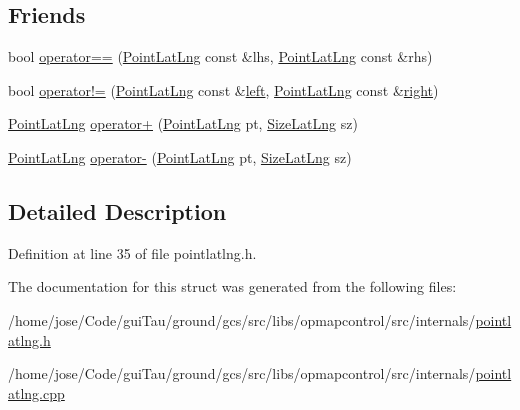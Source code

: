 \subsection*{Friends}
\begin{DoxyCompactItemize}
\item 
bool \hyperlink{group___o_p_map_widget_ga9265718a15e315e6d89a008c945393b3}{operator==} (\hyperlink{structinternals_1_1_point_lat_lng}{Point\-Lat\-Lng} const \&lhs, \hyperlink{structinternals_1_1_point_lat_lng}{Point\-Lat\-Lng} const \&rhs)
\item 
bool \hyperlink{group___o_p_map_widget_gab7da08dc85e294bae6bc1e2aed690d7f}{operator!=} (\hyperlink{structinternals_1_1_point_lat_lng}{Point\-Lat\-Lng} const \&\hyperlink{glext_8h_a85b8f6c07fbc1fb5d77c2ae090f21995}{left}, \hyperlink{structinternals_1_1_point_lat_lng}{Point\-Lat\-Lng} const \&\hyperlink{glext_8h_a5ffadbbacc6b89cf6218bc43b384d3fe}{right})
\item 
\hyperlink{structinternals_1_1_point_lat_lng}{Point\-Lat\-Lng} \hyperlink{group___o_p_map_widget_ga488020cfd021f98e4856f128d9448367}{operator+} (\hyperlink{structinternals_1_1_point_lat_lng}{Point\-Lat\-Lng} pt, \hyperlink{structinternals_1_1_size_lat_lng}{Size\-Lat\-Lng} sz)
\item 
\hyperlink{structinternals_1_1_point_lat_lng}{Point\-Lat\-Lng} \hyperlink{group___o_p_map_widget_ga7af0e8545fa560e7264f0c7cedae458b}{operator-\/} (\hyperlink{structinternals_1_1_point_lat_lng}{Point\-Lat\-Lng} pt, \hyperlink{structinternals_1_1_size_lat_lng}{Size\-Lat\-Lng} sz)
\end{DoxyCompactItemize}


\subsection{Detailed Description}


Definition at line 35 of file pointlatlng.\-h.



The documentation for this struct was generated from the following files\-:\begin{DoxyCompactItemize}
\item 
/home/jose/\-Code/gui\-Tau/ground/gcs/src/libs/opmapcontrol/src/internals/\hyperlink{pointlatlng_8h}{pointlatlng.\-h}\item 
/home/jose/\-Code/gui\-Tau/ground/gcs/src/libs/opmapcontrol/src/internals/\hyperlink{pointlatlng_8cpp}{pointlatlng.\-cpp}\end{DoxyCompactItemize}
